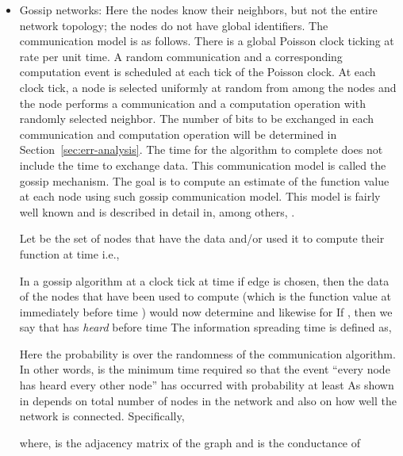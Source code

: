 \documentclass[10pt,twosided,a4paper,draft,onecolumn]{article}
\begin{document}
\begin{itemize}
\item Gossip networks: Here the nodes know their neighbors, but not
  the entire network topology; the nodes do not have global
  identifiers. The communication model is as follows. There is a
  global Poisson clock ticking at rate  per unit time. A random
  communication and a corresponding computation event is scheduled at
  each tick of the Poisson clock. At each clock tick, a node is
  selected uniformly at random from among the  nodes and the node
  performs a communication and a computation operation with randomly
  selected neighbor. The number of bits to be exchanged in each communication and computation operation 
  will be determined in Section~\ref{sec:err-analysis}. 
  The time for the algorithm to complete does not include the time to exchange data.   
  This communication model is called the gossip mechanism. The goal is to compute an 
  estimate of the function value at each node using such gossip
  communication model. This model is fairly well known and is
  described in detail in, among others, \cite{Shah09,Boyd05}.

  Let  be the set of nodes that have the data  and/or used it to compute 
  their function at time  i.e.,

In a gossip algorithm at a clock tick at time  if edge  is chosen, then the
  data of the nodes that have been used to compute  
  (which is the function value at  immediately before time ) would now
  determine  and likewise for 
  If , then we say that  has \emph{heard}  before
  time  The information spreading time is defined as,

Here the probability is over the randomness of the communication
  algorithm. In other words,  is the minimum time required so
  that the event ``every node has heard every other node'' has
  occurred with probability at least  As shown in
  \cite{Mosk-Aoyama06}  depends on total number of nodes in the
  network and also on how well the network is connected. Specifically, 

where,  is the adjacency matrix of the graph and  is the
  conductance of 


\end{itemize}
\end{document}
